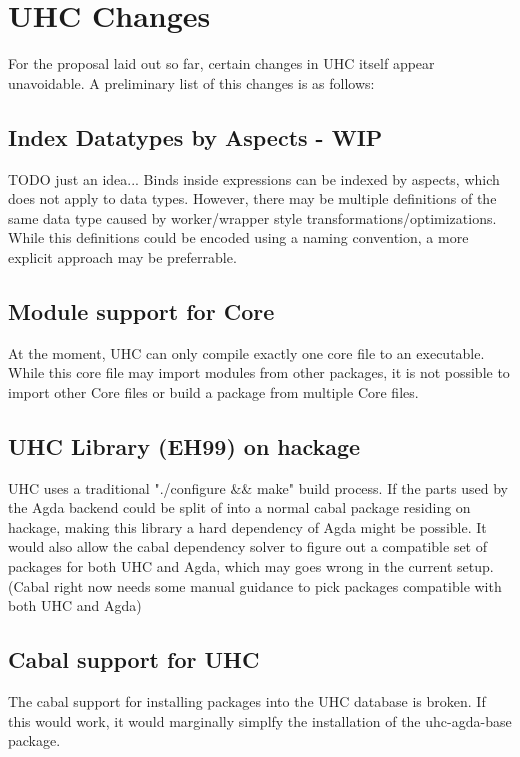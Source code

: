 \documentclass[12pt, a4paper, twoside]{report}
\begin{document}
\section{UHC Changes}
For the proposal laid out so far, certain changes in UHC itself appear
unavoidable. A preliminary list of this changes is as follows:

\subsection{Index Datatypes by Aspects - WIP}
TODO just an idea...
Binds inside expressions can be indexed by aspects, which does
not apply to data types. However, there may be multiple definitions
of the same data type caused by worker/wrapper style transformations/optimizations.
While this definitions could be encoded using a naming convention, a more explicit
approach may be preferrable.

\subsection{Module support for Core}
At the moment, UHC can only compile exactly one core file to an executable.
While this core file may import modules from other packages, it is not possible
to import other Core files or build a package from multiple Core files.

\subsection{UHC Library (EH99) on hackage}
UHC uses a traditional "./configure \&\& make" build process. If the parts used by the
Agda backend could be split of into a normal cabal package residing on hackage,
making this library a hard dependency of Agda might be possible.
It would also allow the cabal dependency solver to figure out a compatible
set of packages for both UHC and Agda, which may goes wrong in the current setup.
(Cabal right now needs some manual guidance to pick packages compatible with both UHC and Agda)

\subsection{Cabal support for UHC}
The cabal support for installing packages into the UHC database is broken. If this would work, it
would marginally simplfy the installation of the uhc-agda-base package.


{}

\end{document}
